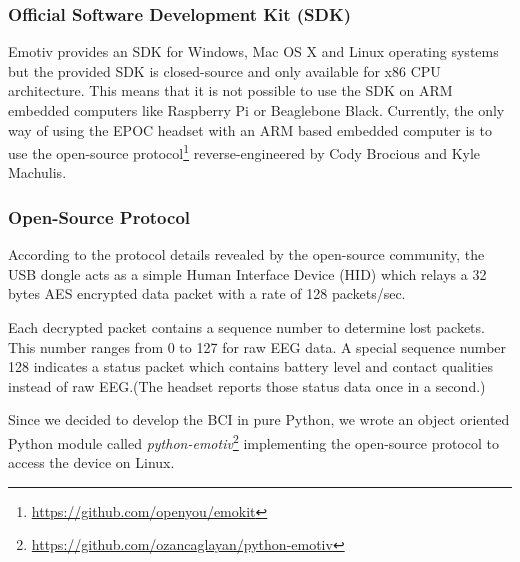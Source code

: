 \documentclass[12pt]{article}
\newcommand\mysubsubsection[1]{\subsubsection{#1}}
\numberwithin{equation}{section}
\numberwithin{figure}{section}
\numberwithin{table}{section}
\begin{document}
\mysubsubsection{Official Software Development Kit (SDK)}\label{seq:emotivepoceeg_sdk}

\par{
Emotiv provides an SDK for Windows, Mac OS X and Linux operating systems but the provided SDK is 
closed-source and only available for x86 CPU architecture. This means that it is not possible 
to use the SDK on ARM embedded computers like Raspberry Pi or Beaglebone Black. 
Currently, the only way of using the EPOC headset with an ARM based embedded computer is to use the 
open-source protocol\footnote{\url{https://github.com/openyou/emokit}} reverse-engineered by Cody Brocious and Kyle Machulis. 
}

\mysubsubsection{Open-Source Protocol}\label{seq:emotivepoceeg_opensource}

\par{
According to the protocol details revealed by the open-source community, 
the USB dongle acts as a simple Human Interface Device (HID) which relays a 
32 bytes AES encrypted data packet with a rate of 128 packets/sec.
}

\par{
Each decrypted packet contains a sequence number to determine lost packets. 
This number ranges from 0 to 127 for raw EEG data. A special sequence number 
128 indicates a status packet which contains battery level and contact 
qualities instead of raw EEG.(The headset reports those status data once in a second.)
}

\par{
Since we decided to develop the BCI in pure Python, we wrote an object oriented 
Python module called \emph{python-emotiv}\footnote{\url{https://github.com/ozancaglayan/python-emotiv}} implementing the open-source protocol to access the device on Linux.
}


\clearpage
\vspace*{-0.35cm}

\thispagestyle{empty}


\clearpage
\cfoot{}
\vspace*{-0.35cm}
\thispagestyle{empty}
\end{document}
